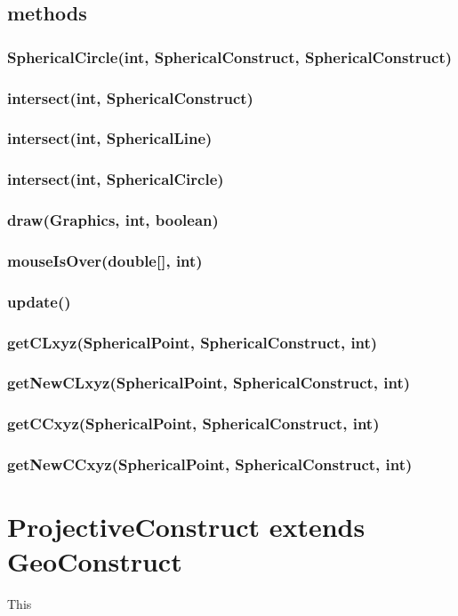 \documentclass[a4paper,10pt]{report}
\begin{document}
\subsection{methods}
\subsubsection{SphericalCircle(int, SphericalConstruct, SphericalConstruct)}
\subsubsection{intersect(int, SphericalConstruct)}
\subsubsection{intersect(int, SphericalLine)}
\subsubsection{intersect(int, SphericalCircle)}
\subsubsection{draw(Graphics, int, boolean)}
\subsubsection{mouseIsOver(double[], int)}
\subsubsection{update()}
\subsubsection{getCLxyz(SphericalPoint, SphericalConstruct, int)}
\subsubsection{getNewCLxyz(SphericalPoint, SphericalConstruct, int)}
\subsubsection{getCCxyz(SphericalPoint, SphericalConstruct, int)}
\subsubsection{getNewCCxyz(SphericalPoint, SphericalConstruct, int)}
\section{ProjectiveConstruct extends GeoConstruct} This
\end{document}
